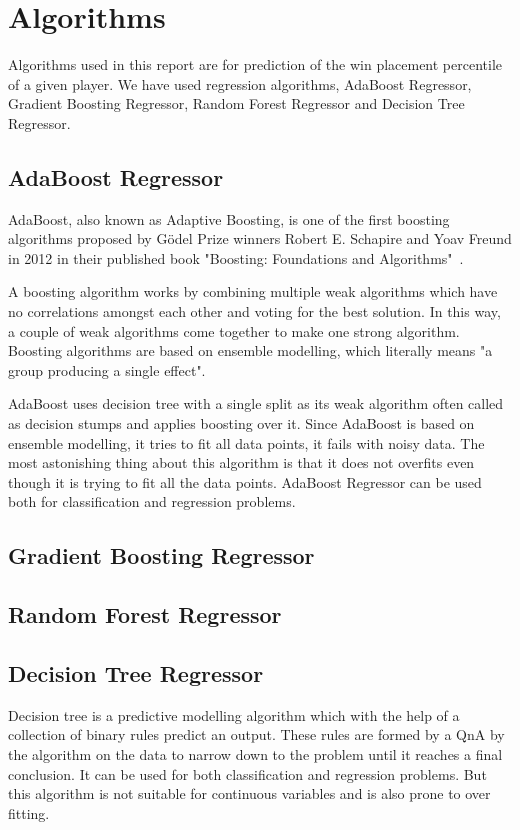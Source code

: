 \documentclass[journal,twoside,web]{ieeecolor}
\begin{document}
\section{Algorithms}
\label{sec:algorithms}
Algorithms used in this report are for prediction of the win placement percentile of a given player. We have used regression algorithms, AdaBoost Regressor, Gradient Boosting Regressor, Random Forest Regressor and Decision Tree Regressor.

\subsection{AdaBoost Regressor}
AdaBoost, also known as Adaptive Boosting, is one of the first boosting algorithms proposed by Gödel Prize winners Robert E. Schapire and Yoav Freund in 2012 in their published book "Boosting: Foundations and Algorithms"~\cite{schapire_boosting_2012}. 

A boosting algorithm works by combining multiple weak algorithms which have no correlations amongst each other and voting for the best solution. In this way, a couple of weak algorithms come together to make one strong algorithm. Boosting algorithms are based on ensemble modelling, which literally means "a group producing a single effect".

AdaBoost uses decision tree with a single split as its weak algorithm often called as decision stumps and applies boosting over it. Since AdaBoost is based on ensemble modelling, it tries to fit all data points, it fails with noisy data. The most astonishing thing about this algorithm is that it does not overfits even though it is trying to fit all the data points. AdaBoost Regressor can be used both for classification and regression problems.

\subsection{Gradient Boosting Regressor}


\subsection{Random Forest Regressor}


\subsection{Decision Tree Regressor}
Decision tree is a predictive modelling algorithm which with the help of a collection of binary rules predict an output. These rules are formed by a QnA by the algorithm on the data to narrow down to the problem until it reaches a final conclusion. It can be used for both classification and regression problems. But this algorithm is not suitable for continuous variables and is also prone to over fitting.
\end{document}
